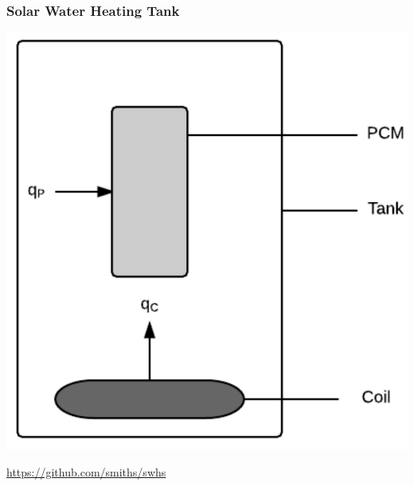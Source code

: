 \documentclass{beamer}
\begin{document}

\begin{frame}

\frametitle{Solar Water Heating Tank}

\begin{center}
\includegraphics[scale=0.45]{Tank.pdf}
\end{center}

\href{https://github.com/smiths/swhs}{https://github.com/smiths/swhs}

\end{frame}

\end{document}
